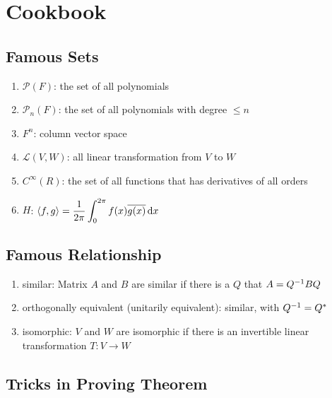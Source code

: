 \chapter{Cookbook}

\section{Famous Sets}

\begin{enumerate}
    \item $\mathcal{P}(F)$: the set of all polynomials
    \item $\mathcal{P}_n (F)$: the set of all polynomials with degree $\leq n$
    \item $F^n$: column vector space
    \item $\mathcal{L}(V,W)$: all linear transformation from $V$ to $W$
    \item $C^\infty (R)$: the set of all functions that has derivatives of all orders
    \item $H$: $\displaystyle \innerproduct{f}{g} = \frac{1}{2 \pi} \int_{0}^{2\pi} f(x) \conjugate{g(x)} \dif x$
\end{enumerate}

\section{Famous Relationship}
\begin{enumerate}
    \item similar: Matrix $A$ and $B$ are similar if there is a $Q$ that $A = {Q}^{-1} B Q$
    \item orthogonally equivalent (unitarily equivalent): similar, with ${Q}^{-1} = Q^*$
    \item isomorphic: $V$ and $W$ are isomorphic if there is an invertible linear transformation $T:V \rightarrow W$
\end{enumerate}


\section{Tricks in Proving Theorem}

